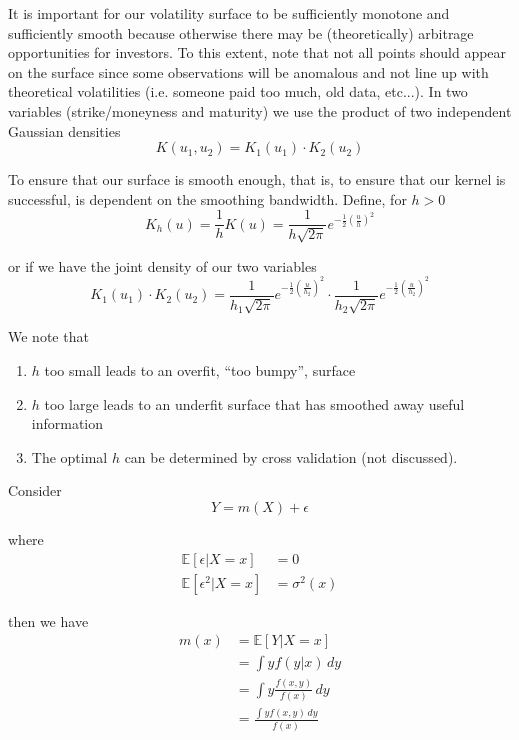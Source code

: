 \documentclass[12pt]{article}
\newlength\tindent
\renewcommand{\indent}{\hspace*{\tindent}}
\begin{document}
\indent It is important for our volatility surface to be sufficiently monotone and sufficiently smooth because otherwise there may be (theoretically) arbitrage opportunities for investors. To this extent, note that not all points should appear on the surface since some observations will be anomalous and not line up with theoretical volatilities (i.e. someone paid too much, old data, etc...). In two variables (strike/moneyness and maturity) we use the product of two independent Gaussian densities
\begin{equation*}
	K(u_1, u_2) = K_1(u_1)\cdot K_2(u_2)
\end{equation*}

\indent To ensure that our surface is smooth enough, that is, to ensure that our kernel is successful, is dependent on the smoothing bandwidth. Define, for $h > 0$
\begin{equation*}
	K_h(u) = \frac{1}{h}K(u) = \frac{1}{h\sqrt{2\pi}} e^{-\frac{1}{2}(\frac{u}{h})^2}
\end{equation*}

or if we have the joint density of our two variables
\begin{equation*}
	K_1(u_1)\cdot K_2(u_2) = \frac{1}{h_1\sqrt{2\pi}} e^{-\frac{1}{2}(\frac{u}{h_2})^2} \cdot \frac{1}{h_2\sqrt{2\pi}} e^{-\frac{1}{2}(\frac{u}{h_2})^2}
\end{equation*}

We note that
\begin{enumerate}
	\item $h$ too small leads to an overfit, ``too bumpy'', surface
	\item $h$ too large leads to an underfit surface that has smoothed away useful information 
	\item The optimal $h$ can be determined by cross validation (not discussed).
\end{enumerate}

Consider
\begin{equation*}
	Y = m(X) + \epsilon
\end{equation*}

where
\begin{align*}
	\mathbb E[\epsilon | X = x] &= 0 \\
	\mathbb E[\epsilon^2|X = x] &= \sigma^2(x)
\end{align*}

then we have
\begin{align*}
	m(x) &= \mathbb E[Y|X = x] \\
	&= \int yf(y|x)\,dy \\
	&= \int y \frac{f(x,y)}{f(x)}\,dy \\
	&= \frac{\int y f(x,y)\,dy}{f(x)}
\end{align*}
\end{document}
